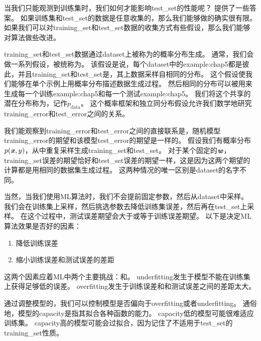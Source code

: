 
当我们只能观测到训练集时，我们如何才能影响\gls{test_set}的性能呢？
提供了一些答案。
如果训练集和\gls{test_set}的数据是任意收集的，那么我们能够做的确实很有限。
如果我们可以对\gls{training_set}和\gls{test_set}数据的收集方式有些假设，那么我们能够对算法做些改进。

\gls{training_set}和\gls{test_set}数据通过\gls{dataset}上被称为的概率分布生成。
通常，我们会做一系列假设，被统称为。
该假设是说，每个\gls{dataset}中的\gls{example:chap5}都是彼此，并且\gls{training_set}和\gls{test_set}是，其上数据采样自相同的分布。
这个假设使我们能够在单个示例上用概率分布描述数据生成过程。
然后相同的分布可以被用来生成每一个训练\gls{example:chap5}和每一个测试\gls{example:chap5}。
我们将这个共享的潜在分布称为，记作$p_{\text{data}}$。
这个概率框架和独立同分布假设允许我们数学地研究\gls{training_error}和\gls{test_error}之间的关系。

我们能观察到\gls{training_error}和\gls{test_error}之间的直接联系是，随机模型\gls{training_error}的期望和该模型\gls{test_error}的期望是一样的。
假设我们有概率分布$p(\boldsymbol{\mathit{x}},y)$，从中重复采样生成\gls{training_set}和\gls{test_set}。
对于某个固定的$\boldsymbol{\mathit{w}}$，\gls{training_set}误差的期望恰好和\gls{test_set}误差的期望一样，这是因为这两个期望的计算都是用相同的数据集生成过程。
这两种情况的唯一区别是\gls{dataset}的名字不同。

当然，当我们使用\gls{ML}算法时，我们不会提前固定参数，然后从\gls{dataset}中采样。
我们会在训练集上采样，然后挑选参数去降低训练集误差，然后再在\gls{test_set}上采样。
在这个过程中，测试误差期望会大于或等于训练误差期望。
以下是决定\gls{ML}算法效果是否好的因素：
\begin{enumerate}
    \item 降低训练误差
    \item 缩小训练误差和测试误差的差距
\end{enumerate}

这两个因素应着\gls{ML}中两个主要挑战：和。
\gls{underfitting}发生于模型不能在训练集上获得足够低的误差。
\gls{overfitting}发生于训练误差和和测试误差之间的差距太大。


通过调整模型的，我们可以控制模型是否偏向于\gls{overfitting}或者\gls{underfitting}。
通俗地，模型的\gls{capacity}是指其拟合各种函数的能力。
\gls{capacity}低的模型可能很难适应训练集。
\gls{capacity}高的模型可能会过拟合，因为记住了不适用于\gls{test_set}的\gls{training_set}性质。

